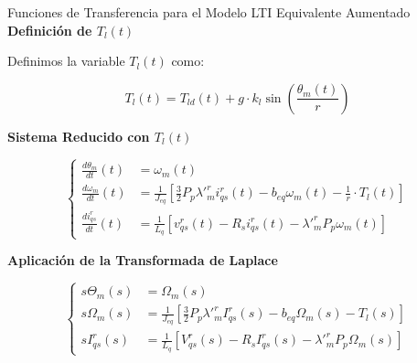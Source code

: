 \documentclass[12pt]{beamer}
\begin{document}
\begin{frame}{\small Funciones de Transferencia para el Modelo LTI Equivalente Aumentado}\scriptsize
    \textbf{Definición de \( T_l(t) \)}

Definimos la variable \( T_l(t) \) como:

\[
T_l(t) = T_{ld}(t) + g \cdot k_l \sin\left(\frac{\theta_m(t)}{r}\right)
\]


\textbf{Sistema Reducido con \( T_l(t) \)}


\[
\left\{
\begin{aligned}
\frac{d\theta_m}{dt}(t) &= \omega_m(t) \\[1ex]
\frac{d\omega_m}{dt}(t) &= \frac{1}{J_{eq}} \left[ \frac{3}{2} P_p \lambda'^r_m i^r_{qs}(t) - b_{eq} \omega_m(t) - \frac{1}{r}\cdot T_l(t) \right] \\[1ex]
\frac{di^r_{qs}}{dt}(t) &= \frac{1}{L_q} \left[ v^r_{qs}(t) - R_s i^r_{qs}(t) - \lambda'^r_m P_p \omega_m(t) \right]
\end{aligned}
\right.
\]


\textbf{Aplicación de la Transformada de Laplace}

\[
\left\{
\begin{aligned}
s\Theta_m(s) &= \Omega_m(s) \\[1ex]
s\Omega_m(s) &= \frac{1}{J_{eq}} \left[ \frac{3}{2} P_p \lambda'^r_m I^r_{qs}(s) - b_{eq} \Omega_m(s) - T_l(s) \right] \\[1ex]
sI^r_{qs}(s) &= \frac{1}{L_q} \left[ V^r_{qs}(s) - R_s I^r_{qs}(s) - \lambda'^r_m P_p \Omega_m(s) \right]
\end{aligned}
\right.
\]
\end{frame}
\end{document}
